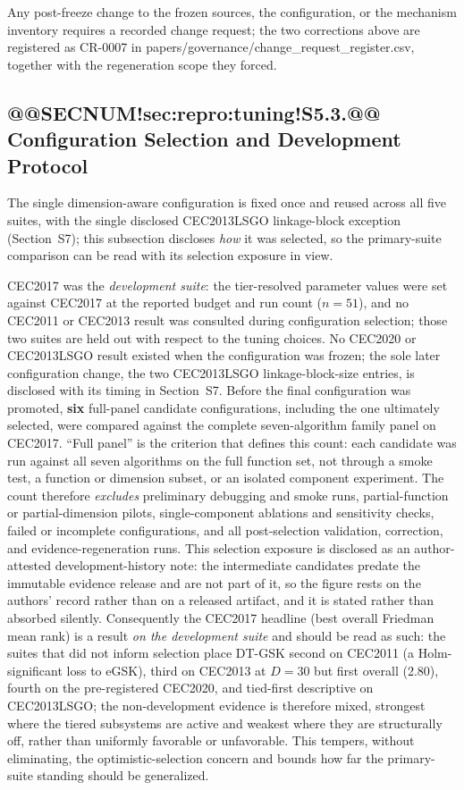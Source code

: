 \documentclass[10pt,a4paper]{article}
\newcommand{\dtgsk}{DT-GSK}
\newcommand{\egsk}{eGSK}
\begin{document}
Any post-freeze change to the frozen sources, the configuration, or the
mechanism inventory requires a recorded change request; the two corrections
above are registered as CR-0007 in
papers/governance/change\_request\_register.csv, together with the
regeneration scope they forced.


\subsection{@@SECNUM!sec:repro:tuning!S5.3.@@ Configuration Selection and Development Protocol}\label{sec:repro:tuning}

The single dimension-aware configuration is fixed once and reused across
all five suites, with the single disclosed CEC2013LSGO linkage-block
exception (Section~S7); this subsection discloses \emph{how} it was selected, so the
primary-suite comparison can be read with its selection exposure in view.

CEC2017 was the \emph{development suite}: the tier-resolved parameter values
were set against CEC2017 at the reported budget and run count ($n=51$), and no
CEC2011 or CEC2013 result was consulted during configuration selection; those
two suites are held out with respect to the tuning choices. No CEC2020 or
CEC2013LSGO result existed when the configuration was frozen; the sole
later configuration change, the two CEC2013LSGO linkage-block-size
entries, is disclosed with its timing in Section~S7. Before the final
configuration was promoted, \textbf{six} full-panel candidate configurations,
including the one ultimately selected, were
compared against the complete seven-algorithm family panel on CEC2017. ``Full
panel'' is the criterion that defines this count: each candidate was run against
all seven algorithms on the full function set, not through a smoke test, a
function or dimension subset, or an isolated component experiment. The count
therefore \emph{excludes} preliminary debugging and smoke runs,
partial-function or partial-dimension pilots, single-component ablations and
sensitivity checks, failed or incomplete configurations, and all post-selection
validation, correction, and evidence-regeneration runs. This selection exposure
is disclosed as an author-attested development-history note: the
intermediate candidates predate the immutable evidence release and are not part
of it, so the figure rests on the authors' record rather than on a released
artifact, and it is stated rather than absorbed silently. Consequently the CEC2017 headline (best overall Friedman mean rank)
is a result \emph{on the development suite} and should be read as such: the
suites that did not inform selection place \dtgsk{} second on CEC2011 (a
Holm-significant loss to \egsk{}), third on CEC2013 at $D = 30$ but first
overall (2.80), fourth on the pre-registered CEC2020, and tied-first
descriptive on CEC2013LSGO; the non-development evidence is therefore
mixed, strongest where the tiered subsystems are active and weakest
where they are structurally off, rather than uniformly favorable or
unfavorable. This tempers,
without eliminating, the optimistic-selection concern and bounds how far the
primary-suite standing should be generalized.
\end{document}
